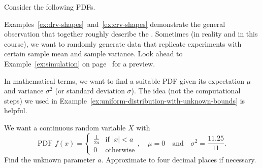 \documentclass[../main.tex]{subfiles}
\begin{document}
\begin{example} \label{ex:crv-shapes}
  Consider the following PDFs.

  \begin{center}

  \end{center}
\end{example}
\clearpage

Examples~\ref{ex:drv-shapes}~and~\ref{ex:crv-shapes} demonstrate the general observation that  together roughly describe the .  Sometimes (in reality and in this course), we want to randomly generate data that replicate experiments with certain sample mean and sample variance.  Look ahead to Example~\ref{ex:simulation} on page~\pageref{ex:simulation} for a preview.

In mathematical terms, we want to find a suitable PDF given its expectation \(\mu\) and variance \(\sigma^{2}\) (or standard deviation \(\sigma\)). The idea (not the computational steps) we used in Example~\ref{ex:uniform-distribution-with-unknown-bounds} is helpful.

\begin{example} \label{ex:uniform-distribution-from-mean-and-stddev}
  We want a continuous random variable \(X\) with 
  \[
    \text{PDF }
    f(x) = 
    \begin{cases}
      \frac{1}{2a} & \text{if } |x| < a \\
      0 & \text{otherwise}
    \end{cases},
    \quad
    \mu = 0 \quad\text{and}\quad \sigma^{2} = \frac{11.25}{11}.
  \]
  Find the unknown parameter \(a\). Approximate to four decimal places if necessary.

\end{example}
\clearpage
\end{document}
